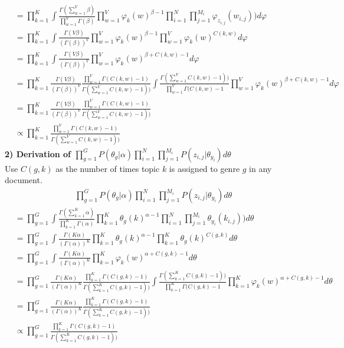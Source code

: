 \begin{align}
&= \prod\limits_{k=1}^K \int\frac{\Gamma (\sum\limits_{w=1}^V \beta)}{\prod\limits_{w=1}^V \Gamma(\beta)} \prod\limits_{w=1}^V  \varphi_{k}(w)^{\beta-1}  \prod^N_{i=1}\prod^{M_i}_{j=1} \varphi_{z_{i,j}}(w_{i,j})) d\varphi\\
&= \prod\limits_{k=1}^K \int \frac{\Gamma (V \beta)}{(\Gamma(\beta))^V} \prod\limits_{w=1}^V  \varphi_{k}(w)^{\beta-1}  \prod\limits_{w=1}^V \varphi_{k}(w)^{C(k,w)} d\varphi\\
&= \prod\limits_{k=1}^K \int \frac{\Gamma (V \beta)}{(\Gamma(\beta))^V}  \prod\limits_{w=1}^V \varphi_{k}(w)^{\beta + C(k,w) -1} d\varphi\\
&= \prod\limits_{k=1}^K \frac{\Gamma (V \beta)}{(\Gamma(\beta))^V}  \frac{\prod\limits_{w=1}^V \Gamma(C(k,w)-1)}{\Gamma(\sum\limits_{w=1}^V C(k,w)-1))} \int \frac{\Gamma(\sum\limits_{w=1}^V C(k,w)-1))}{\prod\limits_{w=1}^V \Gamma(C(k,w)-1}  \prod\limits_{w=1}^V \varphi_{k}(w)^{\beta + C(k,w) -1} d\varphi\\
&=  \prod\limits_{k=1}^K \frac{\Gamma (V \beta)}{(\Gamma(\beta))^V}  \frac{\prod\limits_{w=1}^V \Gamma(C(k,w)-1)}{\Gamma(\sum\limits_{w=1}^V C(k,w)-1))}\\
&\propto \prod\limits_{k=1}^K \frac{\prod\limits_{w=1}^V \Gamma(C(k,w)-1)}{\Gamma(\sum\limits_{w=1}^V C(k,w)-1))}
\end{align}
\textbf{2) Derivation of $\prod\limits_{g=1}^G P(\theta_g|\alpha) \prod^N_{i=1}\prod^{M_i}_{j=1} P(z_{i,j}|\theta_{y_i}) d\theta$}
~\\Use $C(g,k)$ as the number of times topic $k$ is assigned to genre $g$ in any document.
\begin{align}
\prod\limits_{g=1}^G P(\theta_g|\alpha) \prod^N_{i=1}\prod^{M_i}_{j=1} P(z_{i,j}|\theta_{y_i}) d\theta
\end{align}
\begin{align}
&= \prod\limits_{g=1}^G \int\frac{\Gamma (\sum\limits_{k=1}^K \alpha)}{\prod\limits_{k=1}^K \Gamma(\alpha)} \prod\limits_{k=1}^K  \theta_{g}(k)^{\alpha-1}  \prod^N_{i=1}\prod^{M_i}_{j=1} \theta_{y_{i}}(k_{i,j})) d\theta\\
&= \prod\limits_{g=1}^G \int \frac{\Gamma (K \alpha)}{(\Gamma(\alpha))^K} \prod\limits_{k=1}^K  \theta_{g}(k)^{\alpha-1}  \prod\limits_{k=1}^K \theta_g(k)^{C(g,k)} d\theta\\
&= \prod\limits_{g=1}^G \int \frac{\Gamma (K \alpha)}{(\Gamma(\alpha))^K}  \prod\limits_{k=1}^K \varphi_{k}(w)^{\alpha + C(g,k) -1} d\theta\\
&= \prod\limits_{g=1}^G  \frac{\Gamma (K \alpha)}{(\Gamma(\alpha))^K}  \frac{\prod\limits_{k=1}^K \Gamma(C(g,k)-1)}{\Gamma(\sum\limits_{k=1}^K C(g,k)-1))} \int \frac{\Gamma(\sum\limits_{k=1}^K C(g,k)-1))}{\prod\limits_{k=1}^K \Gamma(C(g,k)-1}  \prod\limits_{k=1}^K \varphi_{k}(w)^{\alpha + C(g,k) -1} d\theta\\
&=  \prod\limits_{g=1}^G  \frac{\Gamma (K \alpha)}{(\Gamma(\alpha))^K}  \frac{\prod\limits_{k=1}^K \Gamma(C(g,k)-1)}{\Gamma(\sum\limits_{k=1}^K C(g,k)-1))} \\
&\propto  \prod\limits_{g=1}^G   \frac{\prod\limits_{k=1}^K \Gamma(C(g,k)-1)}{\Gamma(\sum\limits_{k=1}^K C(g,k)-1))} 
\end{align}
